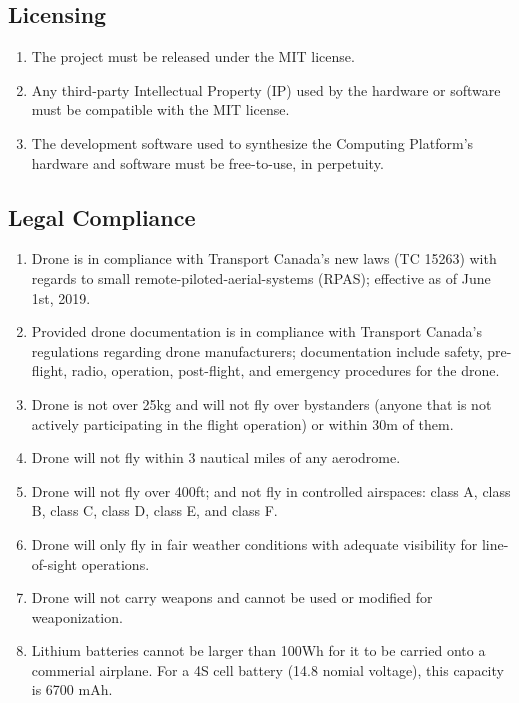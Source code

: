 \documentclass[10pt,letterpaper]{article}
\begin{document}
\subsection{Licensing}
\begin{enumerate}[label=C.EX.\arabic*, wide=1cm, widest=3cm, leftmargin=*, font=\bfseries, noitemsep,topsep=0pt, parsep=4pt, partopsep=0pt]
    \item The project must be released under the MIT license.
    \item Any third-party Intellectual Property (IP) used by the hardware or software must be compatible with the MIT license.
    \item The development software used to synthesize the Computing Platform's hardware and software must be free-to-use, in perpetuity.
\end{enumerate}

\subsection{Legal Compliance}
\begin{enumerate}[label=C.LC.\arabic*, wide=1cm, widest=3cm, leftmargin=*, font=\bfseries, noitemsep,topsep=0pt, parsep=4pt, partopsep=0pt]
    \item Drone is in compliance with Transport Canada's new laws (TC 15263) with regards to small remote-piloted-aerial-systems (RPAS); effective as of June 1st, 2019.
    \item Provided drone documentation is in compliance with Transport Canada's regulations regarding drone manufacturers; documentation include safety, pre-flight, radio, operation, post-flight, and emergency procedures for the drone.
    \item Drone is not over 25kg and will not fly over bystanders (anyone that is not actively participating in the flight operation) or within 30m of them.
    \item Drone will not fly within 3 nautical miles of any aerodrome.
    \item Drone will not fly over 400ft; and not fly in controlled airspaces: class A, class B, class C, class D, class E, and class F.
    \item Drone will only fly in fair weather conditions with adequate visibility for line-of-sight operations.
    \item Drone will not carry weapons and cannot be used or modified for weaponization.
    \item Lithium batteries cannot be larger than 100Wh for it to be carried onto a commerial airplane. For a 4S cell battery (14.8 nomial voltage), this capacity is 6700 mAh.
\end{enumerate}
\end{document}

